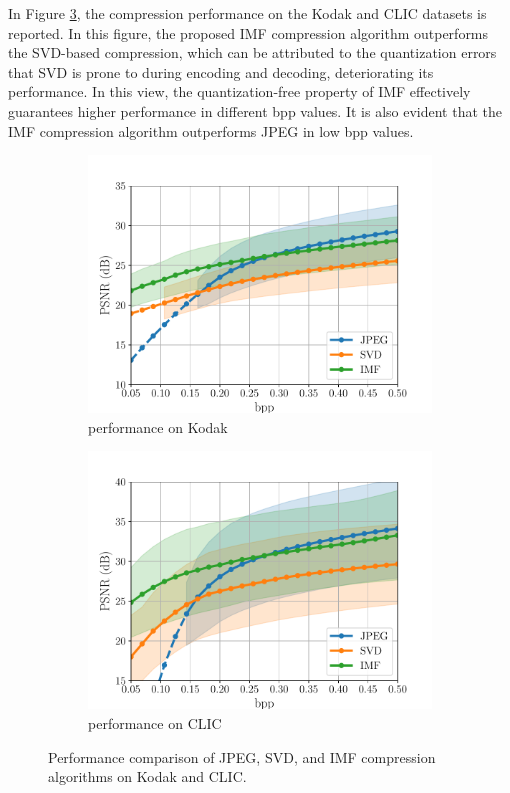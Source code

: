 In Figure \ref{fig: compression_performance_kodak_clic}, the compression performance on the Kodak and CLIC datasets is reported. 
In this figure, the proposed IMF compression algorithm outperforms the SVD-based compression, which can be attributed to the quantization errors that SVD is prone to during encoding and decoding, deteriorating its performance. In this view, the quantization-free property of IMF effectively guarantees higher performance in different bpp values.
It is also evident that the IMF compression algorithm outperforms JPEG in low bpp values.
\begin{figure}[t]
	\centering
	\begin{subfigure}{.45\textwidth}
		\centering
		\includegraphics[width=.95\textwidth]{figures/comparison_kodak_psnr.pdf}
		\caption{performance on Kodak}
		\label{fig: psnr-vs-bpp kodak}
	\end{subfigure}%
	\begin{subfigure}{.45\textwidth}
		\centering
		\includegraphics[width=.95\textwidth]{figures/comparison_clic_psnr.pdf}
		\caption{performance on CLIC}
		\label{fig: psnr-vs-bpp clic}
	\end{subfigure}
	\caption{Performance comparison of JPEG, SVD, and IMF compression algorithms on Kodak and CLIC. 
    }
	\label{fig: compression_performance_kodak_clic}
\end{figure}

